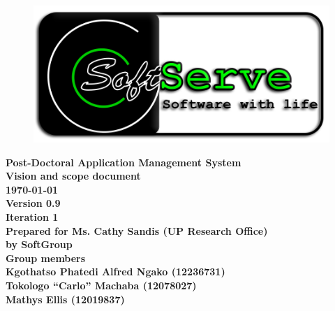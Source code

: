 \documentclass[12pt]{article}
\newcommand{\Title}{Vision and scope document} %
\newcommand{\ssr}{Soft\color{green}{Serve }\color{black}}
\newcommand{\version}{0.9}
\newcommand{\iteration}{1}
\newcommand{\client}{Ms. Cathy Sandis (UP Research Office)}
\newcommand{\project}{Post-Doctoral Application Management System}
\begin{document}
\vspace{4em}

\begin{center}%

\begin{figure}[ht!]
\centering
\includegraphics{../Images_Docs/logo.png}
\end{figure}
\LARGE \bf \project \\[1em]
\LARGE \bf \Title \\[0.25em]
\large \bf \today\\
\bf Version \version\\
\bf Iteration \iteration\\[0.5em]
\Large \bf Prepared for \client\\
\Large \bf by
\Large {\bf \ssr Group }\\[0.5em]
\LARGE {\bf Group members}\\[0.25em]
\large
Kgothatso Phatedi Alfred Ngako (12236731) \\[0.5em]
Tokologo “Carlo” Machaba (12078027) \\[0.5em]
Mathys Ellis (12019837) \\[8em]

\end{center}%

\end{document}
